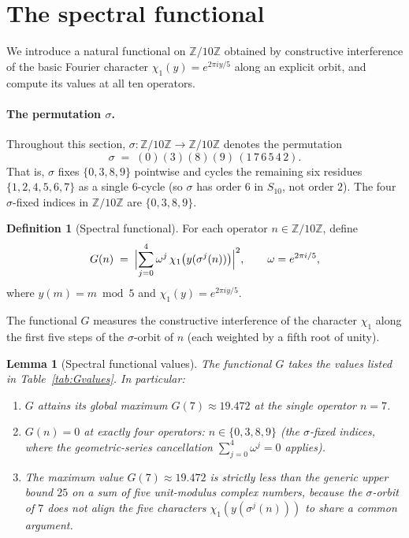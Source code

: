 \documentclass[11pt,reqno]{amsart}
\newtheorem{lemma}[theorem]{Lemma}
\theoremstyle{definition}
\newtheorem{definition}[theorem]{Definition}
\newcommand{\Z}{\mathbb{Z}}
\begin{document}
\section{The spectral functional}
\label{sec:functional}

We introduce a natural functional on $\Z/10\Z$ obtained by
constructive interference of the basic Fourier character
$\chi_{1}(y) = e^{2\pi i y / 5}$ along an explicit orbit, and
compute its values at all ten operators.

\paragraph{The permutation $\sigma$.}
Throughout this section, $\sigma : \Z/10\Z \to \Z/10\Z$ denotes
the permutation
\[
  \sigma \;=\; (0)(3)(8)(9)\,(1\,7\,6\,5\,4\,2).
\]
That is, $\sigma$ fixes $\{0, 3, 8, 9\}$ pointwise and cycles the
remaining six residues $\{1, 2, 4, 5, 6, 7\}$ as a single
$6$-cycle (so $\sigma$ has order $6$ in $S_{10}$, not order $2$).
The four $\sigma$-fixed indices in $\Z/10\Z$ are $\{0, 3, 8, 9\}$.

\begin{definition}[Spectral functional]
\label{def:G}
For each operator $n \in \Z/10\Z$, define
\[
  G(n) \;=\; \Bigl| \sum_{j=0}^{4} \omega^{j} \,
    \chi_{1}\bigl(y(\sigma^{j}(n))\bigr) \Bigr|^{2},
  \qquad \omega = e^{2\pi i / 5},
\]
where $y(m) = m \bmod 5$ and $\chi_{1}(y) = e^{2\pi i y / 5}$.
\end{definition}

The functional $G$ measures the constructive interference of the
character $\chi_{1}$ along the first five steps of the
$\sigma$-orbit of $n$ (each weighted by a fifth root of unity).

\begin{lemma}[Spectral functional values]
\label{lem:spectral}
The functional $G$ takes the values listed in
Table~\ref{tab:Gvalues}. In particular:
\begin{enumerate}\setlength\itemsep{2pt}
\item $G$ attains its global maximum $G(7) \approx 19.472$ at the
single operator $n = 7$.
\item $G(n) = 0$ at exactly four operators: $n \in \{0, 3, 8, 9\}$
(the $\sigma$-fixed indices, where the geometric-series
cancellation $\sum_{j=0}^{4} \omega^{j} = 0$ applies).
\item The maximum value $G(7) \approx 19.472$ is strictly less
than the generic upper bound $25$ on a sum of five unit-modulus
complex numbers, because the $\sigma$-orbit of $7$ does not align
the five characters $\chi_{1}(y(\sigma^{j}(n)))$ to share a
common argument.
\end{enumerate}
\end{lemma}
\end{document}
